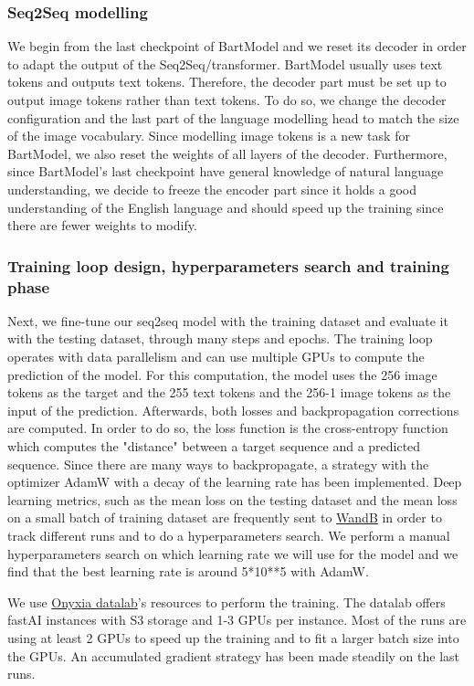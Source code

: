 \documentclass{article}
\begin{document}
\subsubsection{Seq2Seq modelling}
We begin from the last checkpoint of BartModel and we reset its decoder in order to adapt the output of the Seq2Seq/transformer. BartModel usually uses text tokens and outputs text tokens. Therefore, the decoder part must be set up to output image tokens rather than text tokens. To do so, we change the decoder configuration and the last part of the language modelling head to match the size of the image vocabulary. Since modelling image tokens is a new task for BartModel, we also reset the weights of all layers of the decoder.
Furthermore, since BartModel's last checkpoint have general knowledge of natural language understanding, we decide to freeze the encoder part since it holds a good understanding of the English language and should speed up the training since there are fewer weights to modify.

\subsubsection{Training loop design, hyperparameters search and training phase}
Next, we fine-tune our seq2seq model with the training dataset and evaluate it with the testing dataset, through many steps and epochs. The training loop operates with data parallelism and can use multiple GPUs to compute the prediction of the model. For this computation, the model uses the 256 image tokens as the target and the 255 text tokens and the 256-1 image tokens as the input of the prediction.
Afterwards, both losses and backpropagation corrections are computed. In order to do so, the loss function is the cross-entropy function which computes the "distance" between a target sequence and a predicted sequence. Since there are many ways to backpropagate, a strategy with the optimizer AdamW with a decay of the learning rate has been implemented.
Deep learning metrics, such as the mean loss on the testing dataset and the mean loss on a small batch of training dataset are frequently sent to \href{https://wandb.ai/cthiounn/dalle-tiny}{WandB} in order to track different runs and to do a hyperparameters search.
We perform a manual hyperparameters search on which learning rate we will use for the model and we find that the best learning rate is around 5*10**5 with AdamW.

We use \href{https://datalab.sspcloud.fr/}{Onyxia datalab}'s resources to perform the training. The datalab offers fastAI instances with S3 storage and 1-3 GPUs per instance. Most of the runs are using at least 2 GPUs to speed up the training and to fit a larger batch size into the GPUs. An accumulated gradient strategy has been made steadily on the last runs.
\end{document}
